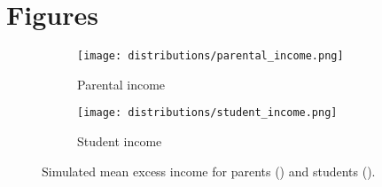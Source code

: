 \newpage
\section{Figures} \label{appendix:figures}
\renewcommand{\thefigure}{\thesection \arabic{figure}}
\setcounter{figure}{0}


\begin{figure}[htbp]
  \centering
  \begin{subfigure}[t]{0.42\linewidth}
    \texttt{[image: distributions/parental\_income.png]}
    \caption{Parental income}
    \label{fig:parents-income-distribution}
  \end{subfigure}
  \hfill
  \begin{subfigure}[t]{0.42\linewidth}
    \texttt{[image: distributions/student\_income.png]}
    \caption{Student income}
    \label{fig:student-income-distribution}
  \end{subfigure}
  \caption{Simulated mean excess income for parents () and students ().}
  \label{fig:income-distributions}
\end{figure}


